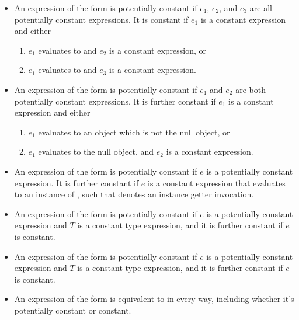 \documentclass[makeidx]{article}
\begin{document}
{\begin{itemize}
\item An expression of the form 
  is potentially constant if $e_1$, $e_2$, and $e_3$
  are all potentially constant expressions.
  It is constant if $e_1$ is a constant expression and either
  \begin{enumerate}
  \item $e_1$ evaluates to \TRUE{} and $e_2$ is a constant expression, or
  \item $e_1$ evaluates to \FALSE{} and $e_3$ is a constant expression.
  \end{enumerate}

\item An expression of the form  is potentially constant
  if $e_1$ and $e_2$ are both potentially constant expressions.
  It is further constant if $e_1$ is a constant expression and either
  \begin{enumerate}
  \item $e_1$ evaluates to an object which is not the null object, or
  \item $e_1$ evaluates to the null object, and $e_2$ is a constant expression.
  \end{enumerate}

\item An expression of the form  is potentially constant
  if $e$ is a potentially constant expression.
  It is further constant if $e$ is a constant expression that
  evaluates to an instance of ,
  such that  denotes an instance getter invocation.

\item An expression of the form  is potentially constant
  if $e$ is a potentially constant expression
  and $T$ is a constant type expression,
  and it is further constant if $e$ is constant.

\item An expression of the form  is potentially constant
  if $e$ is a potentially constant expression
  and $T$ is a constant type expression,
  and it is further constant if $e$ is constant.

\item
  An expression of the form 
  is equivalent to  in every way,
  including whether it's potentially constant or constant.
\end{itemize}

}
\end{document}
